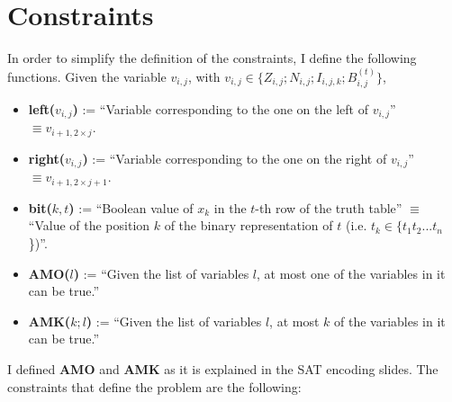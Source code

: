 \documentclass[letterpaper,10pt]{article}
\begin{document}
\section{Constraints}
In order to simplify the definition of the constraints, I define the following functions. Given the variable $v_{i,j}$, with $v_{i,j} \in \{Z_{i,j}; N_{i,j}; I_{i,j,k}; B_{i,j}^{(t)}\}$,
\begin{itemize}
    \item \textbf{left($v_{i,j}$)} := ``Variable corresponding to the one on the left of $v_{i,j}$'' $ \equiv v_{i+1,2\times j}$.
    \item \textbf{right($v_{i,j}$)} := ``Variable corresponding to the one on the right of $v_{i,j}$'' $ \equiv v_{i+1,2\times j+1}$.
    \item \textbf{bit($k,t$)} := ``Boolean value of $x_k$ in the $t$-th row of the truth table'' $\equiv$ ``Value of the position $k$ of the binary representation of $t$ (i.e. $t_k \in \{t_1 t_2 ... t_n$\})''.
    \item  \textbf{AMO($l$)} := ``Given the list of variables $l$, at most one of the variables in it can be true.'' %
    \item \textbf{AMK($k; l$)} := ``Given the list of variables $l$, at most $k$ of the variables in it can be true.''
\end{itemize}
I defined \textbf{AMO} and \textbf{AMK} as it is explained in the SAT encoding slides. The constraints that define the problem are the following:
\end{document}
